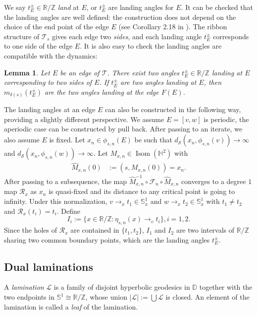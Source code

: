 \documentclass[11pt, reqno]{amsart}
\numberwithin{equation}{section}
\theoremstyle{plain}
\theoremstyle{theorem}
\newtheorem{lem}[theorem]{Lemma}
\theoremstyle{definition}
\newcommand{\R}{\mathbb{R}}
\newcommand{\Z}{\mathbb{Z}}
\newcommand{\Hyp}{\mathbb{H}}
\newcommand{\D}{\mathbb{D}}
\newcommand{\bp}{\mathcal{F}}
\DeclareMathOperator{\Isom}{Isom}
\numberwithin{figure}{section}
\begin{document}
We say $t^\pm_E \in \R/\Z$ {\em land} at $E$, or $t^\pm_E$ are landing angles for $E$.
It can be checked that the landing angles are well defined: the construction does not depend on the choice of the end point of the edge $E$ (see Corollary 2.18 in \cite{Luo21}).
The ribbon structure of $\mathcal{T}_s$ gives each edge two {\em sides}, and each landing angle $t^\pm_E$ corresponds to one side of the edge $E$.
It is also easy to check the landing angles are compatible with the dynamics:
\begin{lem}\label{lem:lacs}
Let $E$ be an edge of $\mathcal{T}$.
There exist two angles $t^\pm_E \in \R/\Z$ landing at $E$ corresponding to two sides of $E$.
If $t_E^\pm$ are two angles landing at $E$, then $m_{\delta(s)}(t_E^\pm)$ are the two angles landing at the edge $F(E)$.
\end{lem}


The landing angles at an edge $E$ can also be constructed in the following way, providing a slightly different perspective.
We assume $E = [v, w]$ is periodic, the aperiodic case can be constructed by pull back.
After passing to an iterate, we also assume $E$ is fixed.
Let $x_n\in \phi_{s,n}(E)$ be such that
$d_\mathcal{S}(x_n, \phi_{s,n}(v)) \to \infty$ and $d_\mathcal{S}(x_n, \phi_{s,n}(w)) \to \infty$.
Let $M_{x, n} \in \Isom (\Hyp^2)$ with 
\begin{align*}
\hat M_{x, n}(0) &:= (s, M_{x, n}(0)) = x_n.
\end{align*}
After passing to a subsequence, the map $\hat M_{x,n}^{-1}\circ \bp_n \circ \hat M_{x,n}$ converges to a degree $1$ map $\mathcal{R}_x$ as $x_n$ is quasi-fixed and its distance to any critical point is going to infinity.
Under this normalization, $v\to_x t_1 \in \mathbb{S}^1_x$ and $w \to_x t_2 \in \mathbb{S}^1_x$ with $t_1 \neq t_2$ and $\mathcal{R}_x(t_i) = t_i$.
Define
$$
I_i:=\{ x \in \R/\Z: \eta_{s,n}(x) \to_v t_i\}, i=1, 2.
$$
Since the holes of $\mathcal{R}_x$ are contained in $\{t_1, t_2\}$, $I_1$ and $I_2$ are two intervals of $\R/\Z$ sharing two common boundary points, which are the landing angles $t^\pm_E$.

\subsection*{Dual laminations}
A {\em lamination} $\mathcal{L}$ is a family of disjoint hyperbolic geodesics in $\D$ together with the two endpoints in $\mathbb{S}^1\cong \R/\Z$, whose union $|\mathcal{L}| :=\bigcup\mathcal{L}$ is closed.
An element of the lamination is called a {\em leaf} of the lamination.
\end{document}
